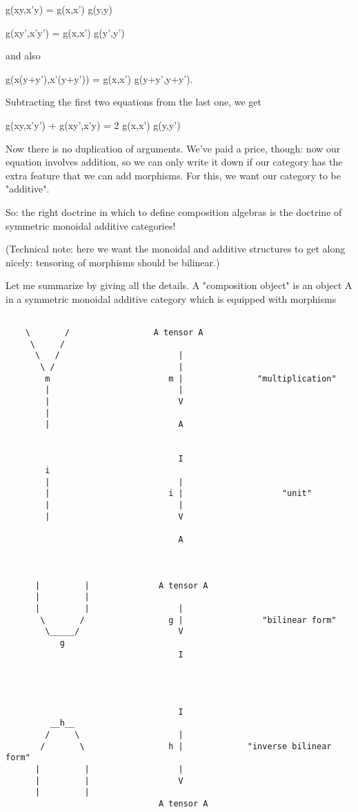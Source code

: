 g(xy,x'y) = g(x,x') g(y,y)

g(xy',x'y') = g(x,x') g(y',y')

and also

g(x(y+y'),x'(y+y')) = g(x,x') g(y+y',y+y').

Subtracting the first two equations from the last one, we get

g(xy,x'y') + g(xy',x'y) = 2 g(x,x') g(y,y')

Now there is no duplication of arguments.  We've paid a price, though:
now our equation involves addition, so we can only write it down if our
category has the extra feature that we can add morphisms.  For this, we
want our category to be "additive".  

So: the right doctrine in which to define composition algebras is
the doctrine of symmetric monoidal additive categories!  

(Technical note: here we want the monoidal and additive structures
to get along nicely: tensoring of morphisms should be bilinear.)

Let me summarize by giving all the details.  A "composition
object" is an object A in a symmetric monoidal additive category
which is equipped with morphisms


\begin{verbatim}

    \       /                 A tensor A
     \     /                       
      \   /                        |
       \ /                         | 
        m                        m |               "multiplication"
        |                          |
        |                          V
        |                          
        |                          A
                                   

                                   I
        i                          
        |                          |
        |                        i |                    "unit"
        |                          |
        |                          V
                       
                                   A



      |         |              A tensor A
      |         |   
      |         |                  |
       \       /                 g |                "bilinear form"
        \_____/                    V
           g               
                                   I




                                   I
         __h__                                
        /     \                    |                 
       /       \                 h |             "inverse bilinear form"  
      |         |                  | 
      |         |                  V
      |         |                 
                               A tensor A
\end{verbatim}
    
